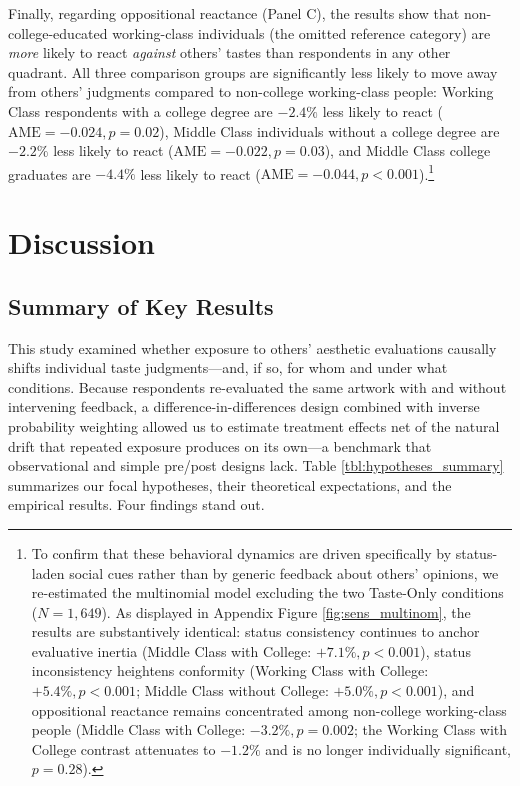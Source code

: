 \documentclass[12pt, letterpaper]{article}
\begin{document}
Finally, regarding oppositional reactance (Panel C), the results show that non-college-educated working-class individuals (the omitted reference category) are \textit{more} likely to react \textit{against} others' tastes than respondents in any other quadrant. All three comparison groups are significantly less likely to move away from others' judgments compared to non-college working-class people: Working Class respondents with a college degree are $-2.4\%$ less likely to react ($\text{AME} = -0.024, p = 0.02$), Middle Class individuals without a college degree are $-2.2\%$ less likely to react ($\text{AME} = -0.022, p = 0.03$), and Middle Class college graduates are $-4.4\%$ less likely to react ($\text{AME} = -0.044, p < 0.001$).\footnote{To confirm that these behavioral dynamics are driven specifically by status-laden social cues rather than by generic feedback about others' opinions, we re-estimated the multinomial model excluding the two Taste-Only conditions ($N = 1,649$). As displayed in Appendix Figure \ref{fig:sens_multinom}, the results are substantively identical: status consistency continues to anchor evaluative inertia (Middle Class with College: $+7.1\%, p < 0.001$), status inconsistency heightens conformity (Working Class with College: $+5.4\%, p < 0.001$; Middle Class without College: $+5.0\%, p < 0.001$), and oppositional reactance remains concentrated among non-college working-class people (Middle Class with College: $-3.2\%, p = 0.002$; the Working Class with College contrast attenuates to $-1.2\%$ and is no longer individually significant, $p = 0.28$).}

\section{Discussion}

\subsection{Summary of Key Results}
This study examined whether exposure to others' aesthetic evaluations causally shifts individual taste judgments---and, if so, for whom and under what conditions. Because respondents re-evaluated the same artwork with and without intervening feedback, a difference-in-differences design combined with inverse probability weighting allowed us to estimate treatment effects net of the natural drift that repeated exposure produces on its own---a benchmark that observational and simple pre/post designs lack. Table \ref{tbl:hypotheses_summary} summarizes our focal hypotheses, their theoretical expectations, and the empirical results. Four findings stand out.
\end{document}
